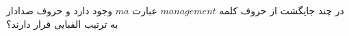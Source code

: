 \p
در چند جایگشت از حروف کلمه $management$
عبارت $ma$ وجود دارد و حروف صدادار به ترتیب الفبایی قرار دارند؟

